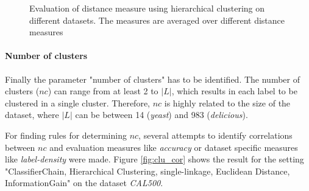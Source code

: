 				\begin{figure}
					\centering			
					\caption{Evaluation of distance measure using hierarchical clustering on different datasets. The measures are averaged over different distance measures}
					\label{fig:fcml_clus_dist}
				\end{figure}


				\paragraph*{Number of clusters} Finally the parameter "number of clusters" has to be identified. The number of clusters ($nc$) can range from at least 2 to $|L|$, which results in each label to be clustered in a single cluster. Therefore, $nc$ is highly related to the size of the dataset, where $|L|$ can be between 14 (\textit{yeast}) and 983 (\textit{delicious}).

				For finding rules for determining $nc$, several attempts to identify correlations between $nc$ and evaluation measures like \textit{accuracy} or dataset specific measures like \textit{label-density} were made. Figure \ref{fig:clu_cor} shows the result for the setting "ClassifierChain, Hierarchical Clustering, single-linkage, Euclidean Distance, InformationGain" on the dataset \textit{CAL500}.
					
